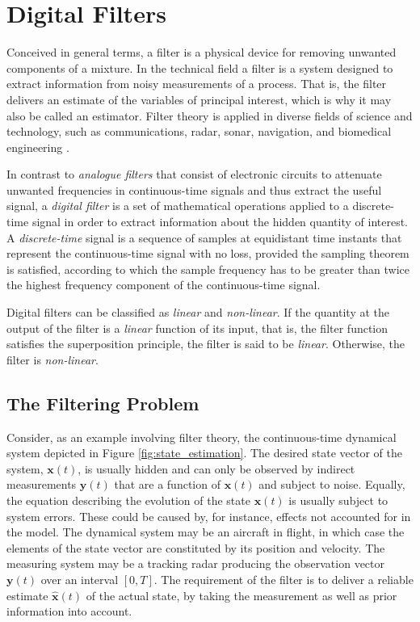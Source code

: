 \chapter{Digital Filters}
\label{ch:digital_filters}

Conceived in general terms, a filter is a physical device for removing unwanted components of a mixture. In the technical field a filter is a system designed to extract information from noisy measurements of a process. That is, the filter delivers an estimate of the variables of principal interest, which is why it may also be called an estimator. Filter theory is applied in diverse fields of science and technology, such as communications, radar, sonar, navigation, and biomedical engineering \cite{haykin2002adaptive}.

In contrast to \emph{analogue filters} that consist of electronic circuits to attenuate unwanted frequencies in continuous-time signals and thus extract the useful signal, a \emph{digital filter} is a set of mathematical operations applied to a discrete-time signal in order to extract information about the hidden quantity of interest. A \emph{discrete-time} signal is a sequence of samples at equidistant time instants that represent the continuous-time signal with no loss, provided the sampling theorem is satisfied, according to which the sample frequency has to be greater than twice the highest frequency component of the continuous-time signal.

Digital filters can be classified as \emph{linear} and \emph{non-linear}. If the quantity at the output of the filter is a \emph{linear} function of its input, that is, the filter function satisfies the superposition principle, the filter is said to be \emph{linear}. Otherwise, the filter is \emph{non-linear}.

\section{The Filtering Problem}

Consider, as an example involving filter theory, the continuous-time dynamical system depicted in Figure \ref{fig:state_estimation}. The desired state vector of the system, $\mathbf{x}(t)$, is usually hidden and can only be observed by indirect measurements $\mathbf{y}(t)$ that are a function of $\mathbf{x}(t)$ and subject to noise. Equally, the equation describing the evolution of the state $\mathbf{x}(t)$ is usually subject to system errors. These could be caused by, for instance, effects not accounted for in the model. The dynamical system may be an aircraft in flight, in which case the elements of the state vector are constituted by its position and velocity. The measuring system may be a tracking radar producing the observation vector $\mathbf{y}(t)$ over an interval $[0, T]$. The requirement of the filter is to deliver a reliable estimate $\hat{\mathbf{x}}(t)$ of the actual state, by taking the measurement as well as prior information into account.

